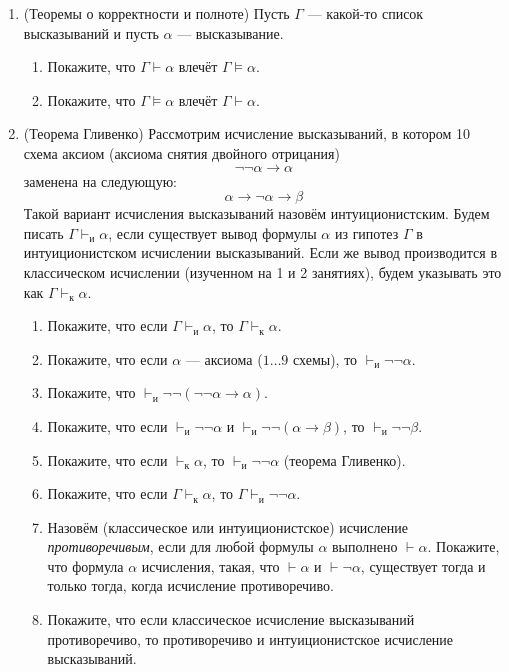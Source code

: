 \documentclass[10pt,a4paper,oneside]{article}
\begin{document}
\begin{enumerate}

\item (Теоремы о корректности и полноте) Пусть $\Gamma$ --- какой-то список
высказываний и пусть $\alpha$ --- высказывание.

\begin{enumerate}
\item Покажите, что $\Gamma\vdash\alpha$ влечёт $\Gamma\models\alpha$.
\item Покажите, что $\Gamma\models\alpha$ влечёт $\Gamma\vdash\alpha$.
\end{enumerate}

\item (Теорема Гливенко) Рассмотрим исчисление высказываний, в котором 10 схема аксиом 
(аксиома снятия двойного отрицания)
$$\neg\neg\alpha\rightarrow\alpha$$
заменена на следующую:
$$\alpha\rightarrow\neg\alpha\rightarrow\beta$$
Такой вариант исчисления высказываний назовём интуиционистским.
Будем писать $\Gamma \vdash_{\texttt{и}} \alpha$, если существует
вывод формулы $\alpha$ из гипотез $\Gamma$ в интуиционистском исчислении
высказываний. Если же вывод производится в классическом исчислении
(изученном на 1 и 2 занятиях), будем указывать это как $\Gamma \vdash_{\texttt{к}} \alpha$.

\begin{enumerate}
\item Покажите, что если $\Gamma \vdash_{\texttt{и}} \alpha$, то 
$\Gamma \vdash_{\texttt{к}} \alpha$.
\item Покажите, что если $\alpha$ --- аксиома ($1\dots 9$ схемы), то 
$\vdash_{\texttt{и}} \neg\neg\alpha$.
\item Покажите, что $\vdash_{\texttt{и}} \neg\neg(\neg\neg\alpha\rightarrow\alpha)$.
\item Покажите, что если $\vdash_{\texttt{и}} \neg\neg\alpha$ и $\vdash_{\texttt{и}} \neg\neg(\alpha\rightarrow\beta)$,
то $\vdash_{\texttt{и}} \neg\neg\beta$.
\item Покажите, что если $\vdash_{\texttt{к}} \alpha$, то $\vdash_{\texttt{и}} \neg\neg\alpha$ (теорема Гливенко).
\item Покажите, что если $\Gamma \vdash_{\texttt{к}} \alpha$, то $\Gamma \vdash_{\texttt{и}} \neg\neg\alpha$.
\item Назовём (классическое или интуиционистское) исчисление \emph{противоречивым}, 
если для любой формулы $\alpha$ выполнено $\vdash \alpha$.
Покажите, что формула $\alpha$ исчисления, такая, что $\vdash \alpha$ и $\vdash\neg\alpha$, 
существует тогда и только тогда, когда исчисление противоречиво.
\item Покажите, что если классическое исчисление высказываний противоречиво, то противоречиво и интуиционистское
исчисление высказываний.
\end{enumerate}

\end{enumerate}
\end{document}
